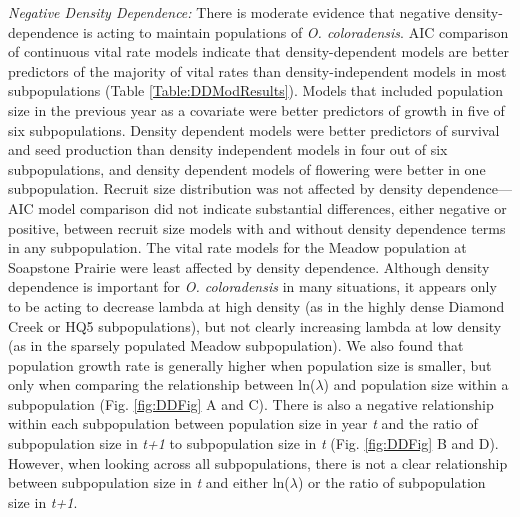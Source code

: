 \documentclass[12pt, letterpaper]{article}
\begin{document}
\textit{Negative Density Dependence:} There is moderate evidence that negative density-dependence is acting to maintain populations of \textit{O. coloradensis}. AIC comparison of continuous vital rate models indicate that density-dependent models are better predictors of the majority of vital rates than density-independent models in most subpopulations (Table \ref{Table:DDModResults}).  Models that included population size in the previous year as a covariate were better predictors of growth in five of six subpopulations. Density dependent models were better predictors of survival and seed production than density independent models in four out of six subpopulations, and density dependent models of flowering were better in one subpopulation. Recruit size distribution was not affected by density dependence—AIC model comparison did not indicate substantial differences, either negative or positive, between recruit size models with and without density dependence terms in any subpopulation. The vital rate models for the Meadow population at Soapstone Prairie were least affected by density dependence. Although density dependence is important for \textit{O. coloradensis} in many situations, it appears only to be acting to decrease lambda at high density (as in the highly dense Diamond Creek or HQ5 subpopulations), but not clearly increasing lambda at low density (as in the sparsely populated Meadow subpopulation). We also found that population growth rate is generally higher when population size is smaller, but only when comparing the relationship between ln($\lambda$) and population size within a subpopulation (Fig. \ref{fig:DDFig} A and C). There is also a negative relationship within each subpopulation between population size in year \textit{t} and the ratio of subpopulation size in \textit{t+1} to subpopulation size in \textit{t} (Fig. \ref{fig:DDFig} B and D). However, when looking across all subpopulations, there is not a clear relationship between subpopulation size in \textit{t} and either ln($\lambda$) or the ratio of subpopulation size in \textit{t+1}.  
\end{document}
